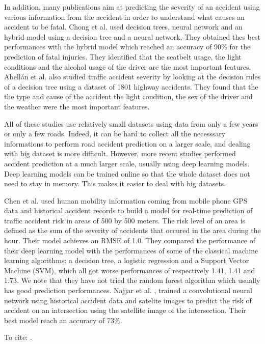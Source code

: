 \documentclass[conference]{IEEEtran}
\begin{document}
  In addition, many publications aim at predicting the severity of an accident using various information from the accident in order to understand what causes an accident to be fatal.
Chong et al.\cite{Chong2005} used decision trees, neural network and an hybrid model using a decision tree and a neural network.
They obtained thes best performances with the hybrid model which reached an accuracy of 90\% for the prediction of fatal injuries.
They identified that the seatbelt usage, the light conditions and the alcohol usage of the driver are the most important features.
Abellán et al. \cite{Abellan2013} also studied traffic accident severity by looking at the decision rules of a decision tree using a dataset of 1801 highway accidents.
They found that the the type and cause of the accident the light condition, the sex of the driver and the weather were the most important features.

All of these studies use relatively small datasets using data from only a few years or only a few roads.
Indeed, it can be hard to collect all the necesssary informations to perform road accident prediction on a larger scale, and dealing with big dataset is more difficult.
However, more recent studies performed accident prediction at a much larger scale, usually using deep learning models.
Deep learning models can be trained online so that the whole dataset does not need to stay in memory.
This makes it easier to deal with big datasets.

Chen et al. \cite{QChen2016} used human mobility information coming from mobile phone GPS data and historical accident records to build a model for real-time prediction of traffic accident risk in areas of 500 by 500 meters.
The risk level of an area is defined as the sum of the severity of accidents that occured in the area during the hour.
Their model achieves an RMSE of 1.0.
They compared the performance of their deep learning model with the performances of some of the classical machine learning algorithms: a decision tree, a logistic regression and a Support Vector Machine (SVM), which all got worse performances of respectively 1.41, 1.41 and 1.73.
We note that they have not tried the random forest algorithm which usually has good prediction performances.
Najjar et al. \cite{Najjar2017}, trained a convolutional neural network using historical accident data and satelite images to predict the risk of accident on an intersection using the satellite image of the intersection.
Their best model reach an accuracy of 73\%.

To cite: \cite{Ren2017, Yuan2018}.
\end{document}
